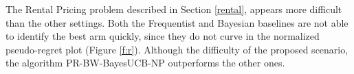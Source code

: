 The Rental Pricing problem described in Section \ref{rental}, appears more difficult than the other settings. Both the Frequentist and Bayesian baselines are not able to identify the best arm quickly, since they do not curve in the normalized pseudo-regret plot (Figure \ref{f:r}). Although the difficulty of the proposed scenario, the algorithm PR-BW-BayesUCB-NP outperforms the other ones.


